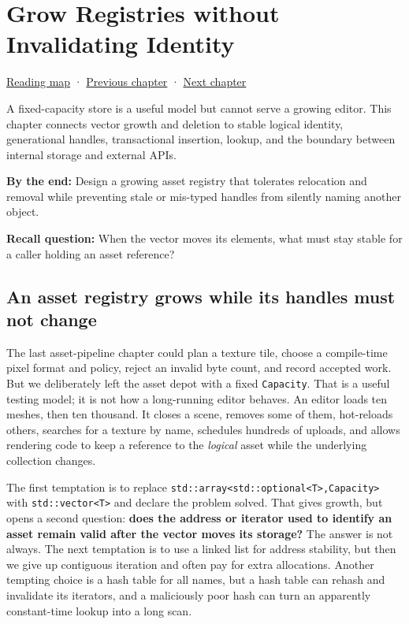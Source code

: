 \chapter{Grow Registries without Invalidating Identity}\label{01-foundations-i-ch006-grow-registries-without-invalidating-identity}\hypertarget{01-foundations-i-ch006}{}\label{stagechapter:01-foundations-i-ch006}

\hyperref[volume-reading-map]{Reading map} · \hyperref[01-foundations-i-ch005-generic-asset-pipelines-without-hidden-contracts]{Previous chapter} · \hyperref[01-foundations-i-ch007-typed-interfaces-identity-and-data-structures]{Next chapter}

A fixed-capacity store is a useful model but cannot serve a growing editor. This chapter connects vector growth and deletion to stable logical identity, generational handles, transactional insertion, lookup, and the boundary between internal storage and external APIs.

\textbf{By the end:} Design a growing asset registry that tolerates relocation and removal while preventing stale or mis-typed handles from silently naming another object.

\textbf{Recall question:} When the vector moves its elements, what must stay stable for a caller holding an asset reference?

\section{An asset registry grows while its handles must not change}\label{01-foundations-i-ch006-an-asset-registry-grows-while-its-handles-must-not-change}

The last asset-pipeline chapter could plan a texture tile, choose a compile-time pixel format and policy, reject an invalid byte count, and record accepted work. But we deliberately left the asset depot with a fixed \texttt{Capacity}. That is a useful testing model; it is not how a long-running editor behaves. An editor loads ten meshes, then ten thousand. It closes a scene, removes some of them, hot-reloads others, searches for a texture by name, schedules hundreds of uploads, and allows rendering code to keep a reference to the \emph{logical} asset while the underlying collection changes.

The first temptation is to replace \texttt{std::array\textless{}std::optional\textless{}T\textgreater{},Capacity\textgreater{}} with \texttt{std::vector\textless{}T\textgreater{}} and declare the problem solved. That gives growth, but opens a second question: \textbf{does the address or iterator used to identify an asset remain valid after the vector moves its storage?} The answer is not always. The next temptation is to use a linked list for address stability, but then we give up contiguous iteration and often pay for extra allocations. Another tempting choice is a hash table for all names, but a hash table can rehash and invalidate its iterators, and a maliciously poor hash can turn an apparently constant-time lookup into a long scan.

